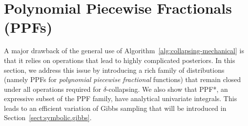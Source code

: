 \documentclass[]{article}
\begin{document}
\section{Polynomial Piecewise Fractionals 
(PPFs)}
\label{sect:ppfs}
A major drawback of the general use of 
Algorithm~\ref{alg:collapsing-mechanical}
is that it relies on operations that lead to highly complicated posteriors. 
In this section, we address this issue by introducing a rich family of distributions (namely PPFs for \emph{polynomial piecewise fractional} functions)
that remain closed under all operations required for $\delta$-collapsing. 
We also show that PPF*, an expressive subset of the PPF family, have analytical univariate integrals.
This leads to an efficient variation of Gibbs sampling that will be introduced in Section~\ref{sect:symbolic.gibbs}.
\end{document}
